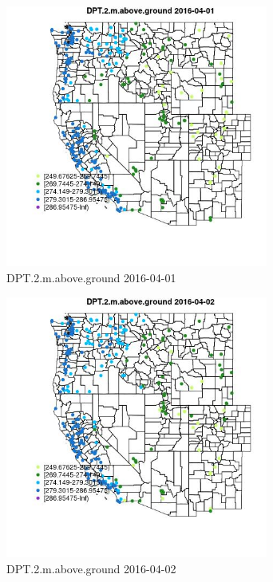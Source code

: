 \begin{figure} 
\centering  
\includegraphics[width=0.77\textwidth]{Code_Outputs/Report_ML_input_PM25_Step4_part_e_de_duplicated_aveswNAs_MapObsDPT2maboveground2016-04-01.jpg} 
\caption{\label{fig:Report_ML_input_PM25_Step4_part_e_de_duplicated_aveswNAsMapObsDPT2maboveground2016-04-01}DPT.2.m.above.ground 2016-04-01} 
\end{figure} 
 

\begin{figure} 
\centering  
\includegraphics[width=0.77\textwidth]{Code_Outputs/Report_ML_input_PM25_Step4_part_e_de_duplicated_aveswNAs_MapObsDPT2maboveground2016-04-02.jpg} 
\caption{\label{fig:Report_ML_input_PM25_Step4_part_e_de_duplicated_aveswNAsMapObsDPT2maboveground2016-04-02}DPT.2.m.above.ground 2016-04-02} 
\end{figure} 
 

